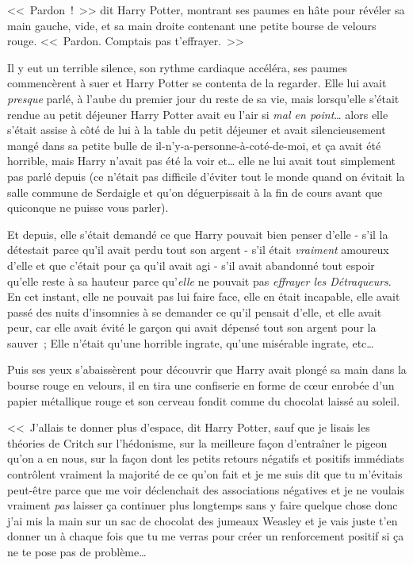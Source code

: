 <<~Pardon~!~>> dit Harry Potter, montrant ses paumes en hâte pour révéler sa main gauche, vide, et sa main droite contenant une petite bourse de velours rouge. <<~Pardon. Comptais pas t'effrayer.~>>

Il y eut un terrible silence, son rythme cardiaque accéléra, ses paumes commencèrent à suer et Harry Potter se contenta de la regarder. Elle lui avait \emph{presque} parlé, à l'aube du premier jour du reste de sa vie, mais lorsqu'elle s'était rendue au petit déjeuner Harry Potter avait eu l'air si \emph{mal en point}… alors elle s'était assise à côté de lui à la table du petit déjeuner et avait silencieusement mangé dans sa petite bulle de il-n'y-a-personne-à-coté-de-moi, et ça avait été horrible, mais Harry n'avait pas été la voir et… elle ne lui avait tout simplement pas parlé depuis (ce n'était pas difficile d'éviter tout le monde quand on évitait la salle commune de Serdaigle et qu'on déguerpissait à la fin de cours avant que quiconque ne puisse vous parler).

Et depuis, elle s'était demandé ce que Harry pouvait bien penser d'elle - s'il la détestait parce qu'il avait perdu tout son argent - s'il était \emph{vraiment} amoureux d'elle et que c'était pour ça qu'il avait agi - s'il avait abandonné tout espoir qu'elle reste à sa hauteur parce qu'\emph{elle} ne pouvait pas \emph{effrayer les Détraqueurs}. En cet instant, elle ne pouvait pas lui faire face, elle en était incapable, elle avait passé des nuits d'insomnies à se demander ce qu'il pensait d'elle, et elle avait peur, car elle avait évité le garçon qui avait dépensé tout son argent pour la sauver~; Elle n'était qu'une horrible ingrate, qu'une misérable ingrate, etc…

Puis ses yeux s'abaissèrent pour découvrir que Harry avait plongé sa main dans la bourse rouge en velours, il en tira une confiserie en forme de cœur enrobée d'un papier métallique rouge et son cerveau fondit comme du chocolat laissé au soleil.

<<~J'allais te donner plus d'espace, dit Harry Potter, sauf que je lisais les théories de Critch sur l'hédonisme, sur la meilleure façon d'entraîner le pigeon qu'on a en nous, sur la façon dont les petits retours négatifs et positifs immédiats contrôlent vraiment la majorité de ce qu'on fait et je me suis dit que tu m'évitais peut-être parce que me voir déclenchait des associations négatives et je ne voulais vraiment \emph{pas} laisser ça continuer plus longtemps sans y faire quelque chose donc j'ai mis la main sur un sac de chocolat des jumeaux Weasley et je vais juste t'en donner un à chaque fois que tu me verras pour créer un renforcement positif si ça ne te pose pas de problème…

